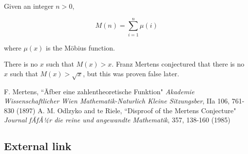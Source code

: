 \documentclass[12pt]{article}
\begin{document}
Given an integer $n > 0$,

$$M(n) = \sum_{i = 1}^n \mu(i)$$

where $\mu(x)$ is the M\"obius function.

There is no $x$ such that $M(x) > x$. Franz Mertens conjectured that there is no $x$ such that $M(x) > \sqrt{x}$, but this was proven false later.

\begin{thebibliography}{6}
 F. Mertens, ``Ãƒber eine zahlentheoretische Funktion" {\it Akademie Wissenschaftlicher Wien Mathematik-Naturlich Kleine Sitzungsber}, IIa 106, 761-830 (1897)
 A. M. Odlzyko and te Riele, ``Disproof of the Mertens Conjecture" {\it Journal fÃƒÂ¼r die reine und angewandte Mathematik}, 357, 138-160 (1985)
\end{thebibliography}

\subsection{External link}

\end{document}
